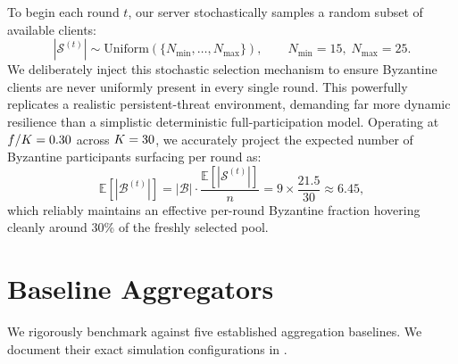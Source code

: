 \documentclass[../main.tex]{subfiles}
\begin{document}
To begin each round $t$, our server stochastically samples a random subset of available clients:
\begin{equation}
    |\mathcal{S}^{(t)}| \sim \mathrm{Uniform}\!\left(\{N_{\min}, \ldots, N_{\max}\}\right), \qquad N_{\min} = 15,\; N_{\max} = 25.
    \label{eq:client_selection}
\end{equation}
We deliberately inject this stochastic selection mechanism to ensure Byzantine clients are never uniformly present in every single round. This powerfully replicates a realistic persistent-threat environment, demanding far more dynamic resilience than a simplistic deterministic full-participation model. Operating at $f/K = 0.30$ across $K = 30$, we accurately project the expected number of Byzantine participants surfacing per round as:
\begin{equation}
    \mathbb{E}[|\mathcal{B}^{(t)}|] = |\mathcal{B}| \cdot \frac{\mathbb{E}[|\mathcal{S}^{(t)}|]}{n} = 9 \times \frac{21.5}{30} \approx 6.45,
    \label{eq:expected_byz}
\end{equation}
which reliably maintains an effective per-round Byzantine fraction hovering cleanly around 30\% of the freshly selected pool.

\section{Baseline Aggregators}
\label{sec:exp_baselines}

We rigorously benchmark \aegis{} against five established aggregation baselines. We document their exact simulation configurations in .

\begin{table}[htbp]
\centering
\caption{Baseline aggregator configurations in our simulation.}
\label{tab:baselines}
\end{table}
\end{document}
